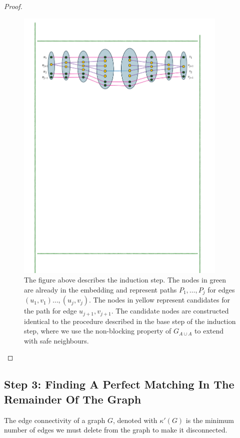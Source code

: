 \documentclass[11pt]{article}
\newcommand{\EdgeConnectivity}[1]{\kappa'(#1)}
\newcommand{\BipartiteG}{G_{A \cup A}}
\begin{document}
\begin{proof}
\begin{figure}
	\includegraphics[width=0.9\textwidth
	]{assets/InductionStep.pdf}
	\caption{The figure above describes the induction step. The nodes in green are already in the embedding and represent paths $P_1, \dots, P_j$ for edges $(u_1, v_1) \dots, (u_j, v_j)$.
	The nodes in yellow represent candidates for the path for edge $u_{j+1}, v_{j+1}$. 
	The candidate nodes are constructed identical to the procedure described in the base step of the induction step, where we use the non-blocking property of $\BipartiteG$ to extend with safe neighbours. 
	}
	\label{fig:induction}
\end{figure}

	
\end{proof}

\subsection{Step 3: Finding A Perfect Matching In The Remainder Of The Graph}

\begin{definition}\label{def:edge-connectivity}
The edge connectivity of a graph $G$, denoted with $\EdgeConnectivity{G}$ is the minimum number of edges we must delete from the graph to make it disconnected.	
\end{definition}
\end{document}
